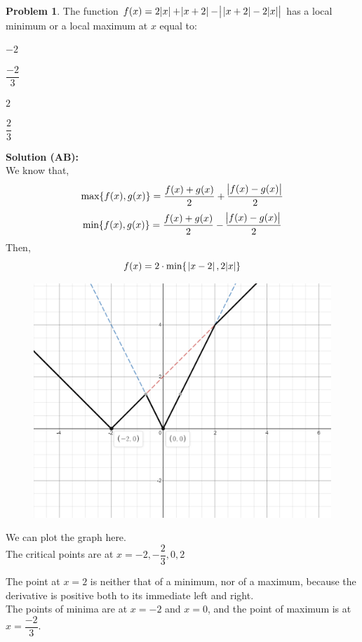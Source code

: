 \documentclass[14]{article}
\theoremstyle{definition}
\newtheorem{prob}{Problem}
\theoremstyle{case}
\begin{document}
\begin{prob}
The function $f(x) = 2 \abs{x} + \abs{x + 2} - \abs{\;\abs{x + 2} - 2 \abs{x}}$ has a local minimum or a local maximum at $x$ equal to:\\
\begin{enumerate*}[label=(\Alph*)]
\item $-2\quad\quad\quad\quad$ 
\item $\dfrac{-2}3\quad\quad\quad\quad$
\item $2\quad\quad\quad\quad$
\item $\dfrac23\quad\quad\quad\quad$\\
\end{enumerate*}
\textbf{Solution (AB):}\\
We know that, 
\[\text{max}\{f(x), g(x)\} = \dfrac{f(x) + g(x)}{2} + \dfrac{\abs{f(x) - g(x)}}{2}\]
\[\text{min}\{f(x), g(x)\} = \dfrac{f(x) + g(x)}{2} - \dfrac{\abs{f(x) - g(x)}}{2}\]
Then, \[f(x) = 2 \cdot \text{min}\{\;\abs{x - 2}, 2\abs{x}\}\]
\begin{figure}[h]
\includegraphics[scale=0.5]{images/prob42}
\end{figure}
We can plot the graph here.\\
The critical points are at $x = -2, -\dfrac23, 0, 2$
\end{prob}
The point at $x=2$ is neither that of a minimum, nor of a maximum, because the derivative is positive both to its immediate left and right.\\
The points of minima are at $x = -2$ and $x = 0$, and the point of maximum is at $x = \dfrac{-2}{3}$.\\
\end{document}
